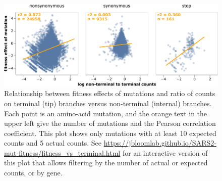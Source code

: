 \documentclass[9pt,twocolumn,twoside]{gsajnl_modified}
\begin{document}
\begin{figure}
\centering
\includegraphics[width=0.75\linewidth]{figs/terminal.png}
\caption{
Relationship between fitness effects of mutations and ratio of counts on terminal (tip) branches versus non-terminal (internal) branches.
Each point is an amino-acid mutation, and the orange text in the upper left give the number of mutations and the Pearson correlation coefficient.
This plot shows only mutations with at least 10 expected counts and 5 actual counts.
See \url{https://jbloomlab.github.io/SARS2-mut-fitness/fitness_vs_terminal.html} for an interactive version of this plot that allows filtering by the number of actual or expected counts, or by gene.
\label{fig:terminal}
}
\end{figure}
\end{document}
